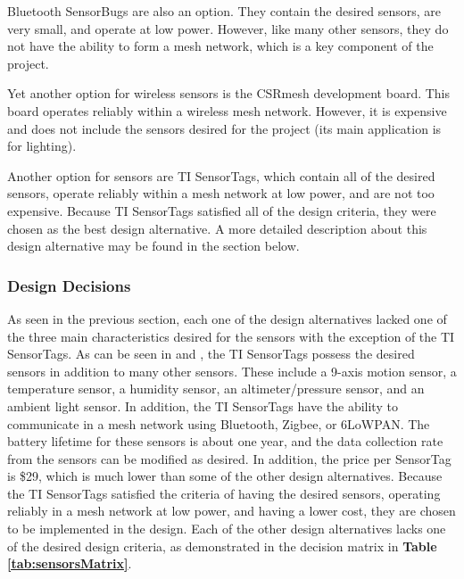 \documentclass[PPFS.tex]{template/subfiles}
\begin{document}
Bluetooth SensorBugs are also an option. They contain the desired sensors, are very small, and operate at low power. However, like many other sensors, they do not have the ability to form a mesh network, which is a key component of the project. \cite{Bluetooth}

Yet another option for wireless sensors is the CSRmesh development board. This board operates reliably within a wireless mesh network. However, it is expensive and does not include the sensors desired for the project (its main application is for lighting). \cite{CSRmesh}

Another option for sensors are TI SensorTags, which contain all of the desired sensors, operate reliably within a mesh network at low power, and are not too expensive. Because TI SensorTags satisfied all of the design criteria, they were chosen as the best design alternative. A more detailed description about this design alternative may be found in the section below. \cite{SensorTag}

\subsubsection{Design Decisions}

As seen in the previous section, each one of the design alternatives lacked one of the three main characteristics desired for the sensors with the exception of the TI SensorTags. As can be seen in  and , the TI SensorTags possess the desired sensors in addition to many other sensors. These include a 9-axis motion sensor, a temperature sensor, a humidity sensor, an altimeter/pressure sensor, and an ambient light sensor. In addition, the TI SensorTags have the ability to communicate in a mesh network using Bluetooth, Zigbee, or 6LoWPAN. The battery lifetime for these sensors is about one year, and the data collection rate from the sensors can be modified as desired. In addition, the price per SensorTag is \$29, which is much lower than some of the other design alternatives. Because the TI SensorTags satisfied the criteria of having the desired sensors, operating reliably in a mesh network at low power, and having a lower cost, they are chosen to be implemented in the design. Each of the other design alternatives lacks one of the desired design criteria, as demonstrated in the decision matrix in \textbf{Table \ref{tab:sensorsMatrix}}. \cite{SensorTag}
\end{document}
